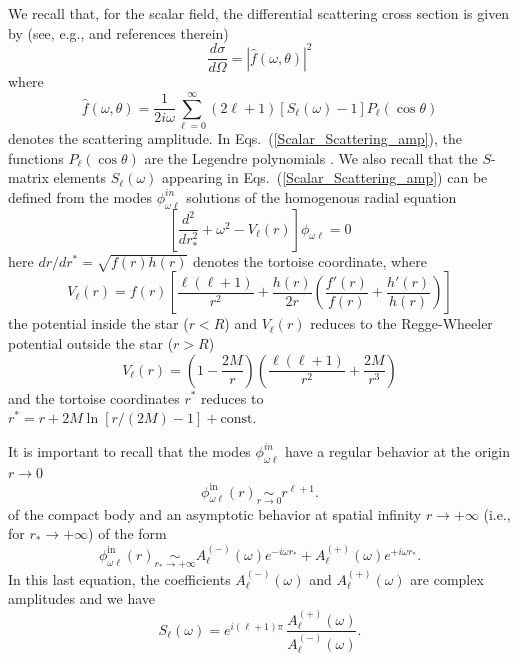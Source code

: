 \documentclass[aps,prd,longbibliography,reprint,twocolumn,amsmath,amssymb,amsfonts,showpacs,superscriptaddress]{revtex4-1}%
\begin{document}
We recall that, for the scalar field, the differential scattering cross section is given by (see, e.g.,\cite{Dolan:2017rtj} and references therein)
\begin{equation}\label{Scalar_Scattering_diff}
  \frac{d\sigma}{d\Omega} = |\hat{f}(\omega,\theta)|^2
\end{equation}
where
\begin{equation}\label{Scalar_Scattering_amp}
 \hat{f}(\omega,\theta) = \frac{1}{2 i \omega} \sum_{\ell = 0}^{\infty} (2\ell+1)[S_{\ell}(\omega)-1]P_{\ell}(\cos\theta)
\end{equation}
denotes the scattering amplitude.  In Eqs.~(\ref{Scalar_Scattering_amp}), the functions $P_{\ell}(\cos\theta)$ are the Legendre polynomials \cite{AS65}.  We also recall that the $S$-matrix elements $S_{\ell}(\omega)$ appearing in Eqs.~(\ref{Scalar_Scattering_amp}) can be defined from the modes $\phi_{\omega \ell}^{in}$ solutions of the homogenous radial equation
\begin{equation}
\label{H_Radial_equation}
\left[\frac{d^{2}}{dr_{\ast}^{2}}+\omega^{2}-V_{\ell}(r)\right]\phi_{\omega\ell}= 0
\end{equation}
here $dr/dr^\ast =\sqrt{f(r)h(r)}$ denotes the tortoise coordinate, where
\begin{equation}\label{Inside_Potentiel}
  V_{\ell}(r) =f(r)\left[\frac{\ell(\ell+1)}{r^2}+\frac{h(r)}{2r}\left(\frac{f'(r)}{f(r)}+\frac{h'(r)}{h(r)}\right)\right]
\end{equation}
the potential inside the star ($r<R$) and  $V_{\ell}(r)$ reduces to the Regge-Wheeler potential outside the star ($r>R$)
\begin{equation}\label{RW_Potentiel}
  V_{\ell}(r) =\left(1-\frac{2M}{r}\right)\left(\frac{\ell(\ell+1)}{r^2}+\frac{2M}{r^3}\right)
\end{equation}
and the tortoise coordinates $r^\ast$ reduces to $r^\ast = r+ 2M \ln [r/(2M) -1]+\mathrm{const}$.

It is important to recall that the modes $\phi_{\omega \ell}^{in}$ have a regular behavior at the origin $r \to 0$
\begin{equation}\label{bc_1_in}
\phi^\mathrm{in}_{\omega  \ell}(r) \scriptstyle{\underset{r \to 0}{\sim}}
\displaystyle{r^{\ell+1}}.
\end{equation}
of the compact body and an asymptotic behavior at spatial infinity $r \to +\infty$ (i.e., for $r_\ast \to +\infty$) of the form
\begin{equation}\label{bc_2_in}
\phi^\mathrm{in}_{\omega  \ell}(r) \scriptstyle{\underset{r_\ast \to +\infty}{\sim}}
\displaystyle{ A^{(-)}_\ell (\omega) e^{-i\omega r_\ast} + A^{(+)}_\ell (\omega) e^{+i\omega r_\ast}}.
\end{equation}
In this last equation, the coefficients $A^{(-)}_\ell (\omega)$ and  $A^{(+)}_\ell (\omega)$ are complex amplitudes and we have
\begin{equation}\label{Matrix_S}
  S_{\ell}(\omega) =  e^{i(\ell+1)\pi} \, \frac{A_{\ell}^{(+)}(\omega)}{A_{\ell}^{(-)}(\omega)}.
\end{equation}
\end{document}
